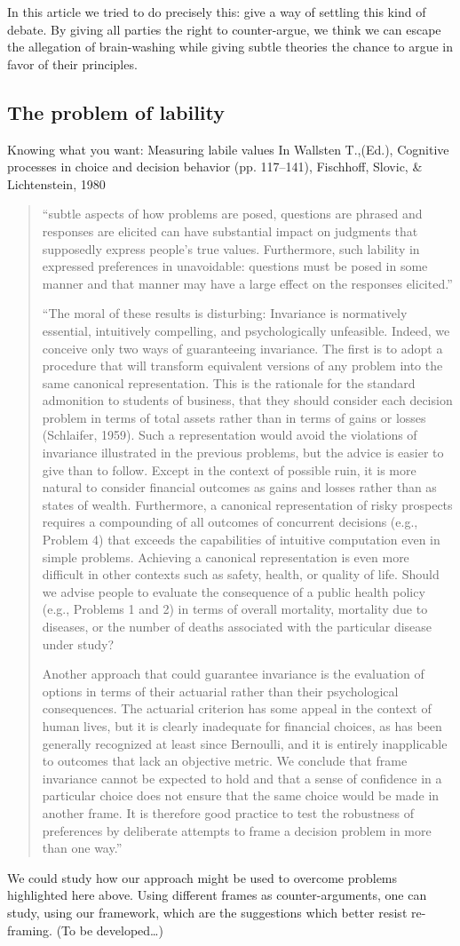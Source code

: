 \documentclass[preprint, french, english, 11pt, authoryear]{elsarticle}%
\begin{document}
In this article we tried to do precisely this: give a way of settling this kind of debate. By giving all parties the right to counter-argue, we think we can escape the allegation of brain-washing while giving subtle theories the chance to argue in favor of their principles.

\subsection{The problem of lability}
Knowing what you want: Measuring labile values In Wallsten T.,(Ed.), Cognitive processes in choice and decision behavior (pp. 117–141), Fischhoff, Slovic, \& Lichtenstein, 1980
\begin{quote}
“subtle aspects of how problems are posed, questions are phrased and responses are elicited can have substantial impact on judgments that supposedly express people’s true values. Furthermore, such lability in expressed preferences in unavoidable: questions must be posed in some manner and that manner may have a large effect on the responses elicited.”

“The moral of these results is disturbing: Invariance is normatively essential, intuitively compelling, and psychologically unfeasible. Indeed, we conceive only two ways of guaranteeing invariance. The first is to adopt a procedure that will transform equivalent versions of any problem into the same canonical representation. This is the rationale for the standard admonition to students of business, that they should consider each decision problem in terms of total assets rather than in terms of gains or losses (Schlaifer, 1959). Such a representation would avoid the violations of invariance illustrated in the previous problems, but the advice is easier to give than to follow. Except in the context of possible ruin, it is more natural to consider financial outcomes as gains and losses rather than as states of wealth. Furthermore, a canonical representation of risky prospects requires a compounding of all outcomes of concurrent decisions (e.g., Problem 4) that exceeds the capabilities of intuitive computation even in simple problems. Achieving a canonical representation is even more difficult in other contexts such as safety, health, or quality of life. Should we advise people to evaluate the consequence of a public health policy (e.g., Problems 1 and 2) in terms of overall mortality, mortality due to diseases, or the number of deaths associated with the particular disease under study?

Another approach that could guarantee invariance is the evaluation of options in terms of their actuarial rather than their psychological consequences. The actuarial criterion has some appeal in the context of human lives, but it is clearly inadequate for financial choices, as has been generally recognized at least since Bernoulli, and it is entirely inapplicable to outcomes that lack an objective metric. We conclude that frame invariance cannot be expected to hold and that a sense of confidence in a particular choice does not ensure that the same choice would be made in another frame. It is therefore good practice to test the robustness of preferences by deliberate attempts to frame a decision problem in more than one way.”
\end{quote}
We could study how our approach might be used to overcome problems highlighted here above. Using different frames as counter-arguments, one can study, using our framework, which are the suggestions which better resist re-framing. (To be developed…)
\end{document}
